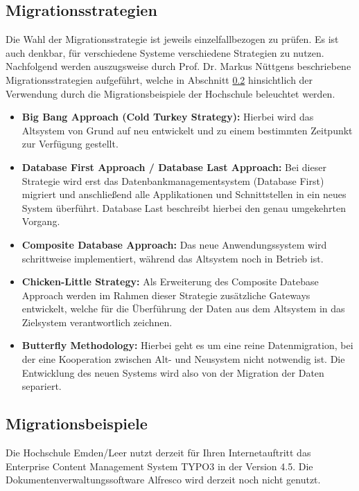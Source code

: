 \subsection{Migrationsstrategien}
Die Wahl der Migrationsstrategie ist jeweils einzelfallbezogen zu prüfen. Es ist auch denkbar, für verschiedene Systeme verschiedene Strategien zu nutzen. Nachfolgend werden auszugsweise durch Prof. Dr. Markus Nüttgens\cite{nuettgens_migration_2015} beschriebene Migrationsstrategien aufgeführt, welche in Abschnitt \ref{subsection_migrationsbeispiele} hinsichtlich der Verwendung durch die Migrationsbeispiele der Hochschule beleuchtet werden.

\begin{itemize}
	\item \textbf{Big Bang Approach (Cold Turkey Strategy):} Hierbei wird das Altsystem von Grund auf neu entwickelt und zu einem bestimmten Zeitpunkt zur Verfügung gestellt.	
	
	\item \textbf{Database First Approach / Database Last Approach:} Bei dieser Strategie wird erst das Datenbankmanagementsystem (Database First) migriert und anschließend alle Applikationen und Schnittstellen in ein neues System überführt. Database Last beschreibt hierbei den genau umgekehrten Vorgang.
	
	\item \textbf{Composite Database Approach:} Das neue Anwendungssystem wird schrittweise implementiert, während das Altsystem noch in Betrieb ist.
	
	\item \textbf{Chicken-Little Strategy:} Als Erweiterung des Composite Datebase Approach werden im Rahmen dieser Strategie zusätzliche Gateways entwickelt, welche für die Überführung der Daten aus dem Altsystem in das Zielsystem verantwortlich zeichnen.
	
	\item \textbf{Butterfly Methodology:} Hierbei geht es um eine reine Datenmigration, bei der eine Kooperation zwischen Alt- und Neusystem nicht notwendig ist.  Die Entwicklung des neuen Systems wird also von der Migration der Daten separiert.
\end{itemize}


\subsection{Migrationsbeispiele}
\label{subsection_migrationsbeispiele}

Die Hochschule Emden/Leer nutzt derzeit für Ihren Internetauftritt das Enterprise Content Management System TYPO3 in der Version 4.5. Die Dokumentenverwaltungssoftware Alfresco wird derzeit noch nicht genutzt. 

